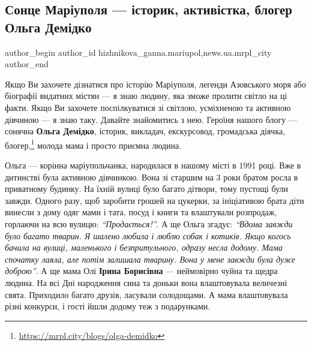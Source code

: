  
 
 
 
 
 
\subsection{Сонце Маріуполя — історик, активістка, блогер Ольга Демідко}
\label{sec:25_10_2019.stz.news.ua.mrpl_city.1.sonce_mrpl_demidko}
 
\ifcmt
 author_begin
   author_id hizhnikova_ganna.mariupol,news.ua.mrpl_city
 author_end
\fi


Якщо Ви захочете дізнатися про історію Маріуполя, легенди Азовського моря або
біографії видатних містян — я знаю людину, яка зможе пролити світло на ці
факти. Якщо Ви захочете поспілкуватися зі світлою, усміхненою та активною
дівчиною — я знаю таку. Давайте знайомитись з нею. Героїня нашого блогу —
сонячна \textbf{Ольга Демідко}, історик, викладач, екскурсовод, громадська діячка,
блогер,\footnote{\url{https://mrpl.city/blogs/olga-demidko}} молода мама і просто приємна людина.


Ольга — корінна маріупольчанка, народилася в нашому місті в 1991 році. Вже в
дитинстві була активною дівчинкою. Вона зі старшим на 3 роки братом росла в
приватному будинку. На їхній вулиці було багато дітвори, тому пустощі були
завжди. Одного разу, щоб заробити грошей на цукерки, за ініціативою брата діти
винесли з дому одяг мами і тата, посуд і книги та влаштували розпродаж,
горлаючи на всю вулицю: \emph{\enquote{Продається!}}. А ще Ольга згадує: \emph{\enquote{Вдома завжди було
багато тварин. Я шалено любила і люблю собак і котиків. Якщо когось бачила на
вулиці, маленького і безпритульного, одразу несла додому. Мама спочатку лаяла,
але потім залишала тварину. Вона у мене завжди була дуже доброю}}. А ще мама Олі
\textbf{Ірина Борисівна} — неймовірно чуйна та щедра людина. На всі Дні народження сина
та доньки вона влаштовувала величезні свята. Приходило багато друзів, ласували
солодощами. А мама влаштовувала різні конкурси, і гості йшли додому теж з
подарунками.

